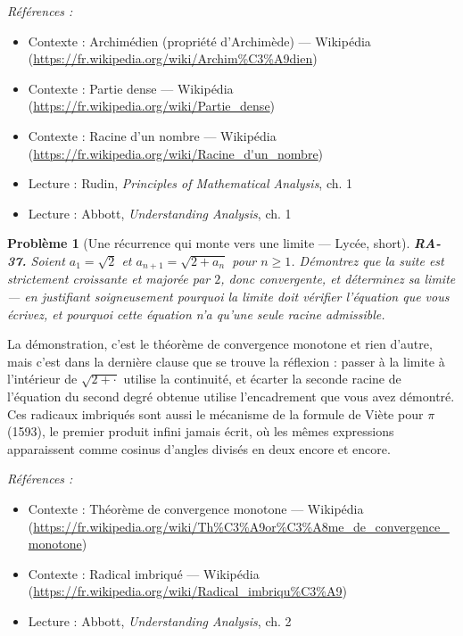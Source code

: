 \documentclass[11pt]{article}
\newtheorem{problem}{Problème}
\newenvironment{refs}{\par\small\noindent\emph{Références :}\begin{itemize}\setlength\itemsep{0pt}}{\end{itemize}\normalsize}
\begin{document}
\begin{refs}
\item Contexte : Archimédien (propriété d'Archimède) --- Wikipédia (\url{https://fr.wikipedia.org/wiki/Archim%C3%A9dien})
\item Contexte : Partie dense --- Wikipédia (\url{https://fr.wikipedia.org/wiki/Partie_dense})
\item Contexte : Racine d'un nombre --- Wikipédia (\url{https://fr.wikipedia.org/wiki/Racine_d'un_nombre})
\item Lecture : Rudin, \textit{Principles of Mathematical Analysis}, ch. 1
\item Lecture : Abbott, \textit{Understanding Analysis}, ch. 1
\end{refs}

\bigskip

\begin{problem}[{Une récurrence qui monte vers une limite --- Lycée, short}]
\textbf{RA-37.} Soient $ a_1 = \sqrt{2} $ et $ a_{n+1} = \sqrt{2 + a_n} $
pour $ n \ge 1 $. Démontrez que la suite est strictement croissante et majorée par $ 2 $, donc
convergente, et déterminez sa limite --- en justifiant soigneusement pourquoi la limite doit vérifier
l'équation que vous écrivez, et pourquoi cette équation n'a qu'une seule racine admissible.
\end{problem}

\noindent La démonstration, c'est le théorème de convergence monotone et rien d'autre, mais
c'est dans la dernière clause que se trouve la réflexion : passer à la limite à l'intérieur de
$ \sqrt{2+\cdot} $ utilise la continuité, et écarter la seconde racine de l'équation du second
degré obtenue utilise l'encadrement que vous avez démontré. Ces radicaux imbriqués sont aussi le
mécanisme de la formule de Viète pour $\pi$ (1593), le premier produit infini jamais écrit, où les mêmes
expressions apparaissent comme cosinus d'angles divisés en deux encore et encore.

\begin{refs}
\item Contexte : Théorème de convergence monotone --- Wikipédia (\url{https://fr.wikipedia.org/wiki/Th%C3%A9or%C3%A8me_de_convergence_monotone})
\item Contexte : Radical imbriqué --- Wikipédia (\url{https://fr.wikipedia.org/wiki/Radical_imbriqu%C3%A9})
\item Lecture : Abbott, \textit{Understanding Analysis}, ch. 2
\end{refs}
\end{document}
